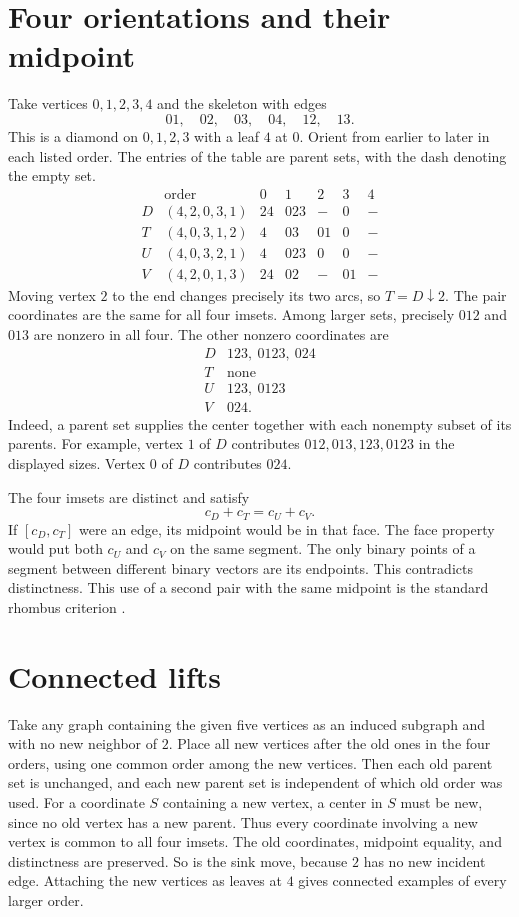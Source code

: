 \documentclass[11pt]{amsart}
\begin{document}
\section{Four orientations and their midpoint}
Take vertices \(0,1,2,3,4\) and the skeleton with edges
\[
  01,\quad 02,\quad 03,\quad 04,\quad 12,\quad 13.
\]
This is a diamond on \(0,1,2,3\) with a leaf \(4\) at \(0\).
Orient from earlier to later in each listed order. The entries of
the table are parent sets, with the dash denoting the empty set.
\[
\begin{array}{c|c|ccccc}
 &\text{order}&0&1&2&3&4\\ \hline
D&(4,2,0,3,1)&24&023&-&0&-\\
T&(4,0,3,1,2)&4&03&01&0&-\\
U&(4,0,3,2,1)&4&023&0&0&-\\
V&(4,2,0,1,3)&24&02&-&01&-
\end{array}
\]
Moving vertex \(2\) to the end changes precisely its two arcs,
so \(T=D\downarrow 2\). The pair coordinates are the same for all
four imsets. Among larger sets, precisely \(012\) and \(013\)
are nonzero in all four. The other nonzero coordinates are
\[
\begin{array}{c|l}
D&123,\ 0123,\ 024\\
T&\text{none}\\
U&123,\ 0123\\
V&024.
\end{array}
\]
Indeed, a parent set supplies the center together with each nonempty
subset of its parents. For example, vertex \(1\) of \(D\) contributes
\(012,013,123,0123\) in the displayed sizes. Vertex \(0\) of \(D\)
contributes \(024\).

The four imsets are distinct and satisfy
\[
                 c_D+c_T=c_U+c_V.
\]
If \([c_D,c_T]\) were an edge, its midpoint would be in that face.
The face property would put both \(c_U\) and \(c_V\) on the same
segment. The only binary points of a segment between different
binary vectors are its endpoints. This contradicts distinctness.
This use of a second pair with the same midpoint is the standard
rhombus criterion \cite[Sec.~2]{rhombus}.

\section{Connected lifts}
Take any graph containing the given five vertices as an induced
subgraph and with no new neighbor of \(2\). Place all new vertices
after the old ones in the four orders, using one common order
among the new vertices. Then each old parent set is unchanged,
and each new parent set is independent of which old order was used.
For a coordinate \(S\) containing a new vertex, a center in \(S\)
must be new, since no old vertex has a new parent. Thus every
coordinate involving a new vertex is common to all four imsets.
The old coordinates, midpoint equality, and distinctness are
preserved. So is the sink move, because \(2\) has no new incident
edge. Attaching the new vertices as leaves at \(4\) gives connected
examples of every larger order.
\end{document}
